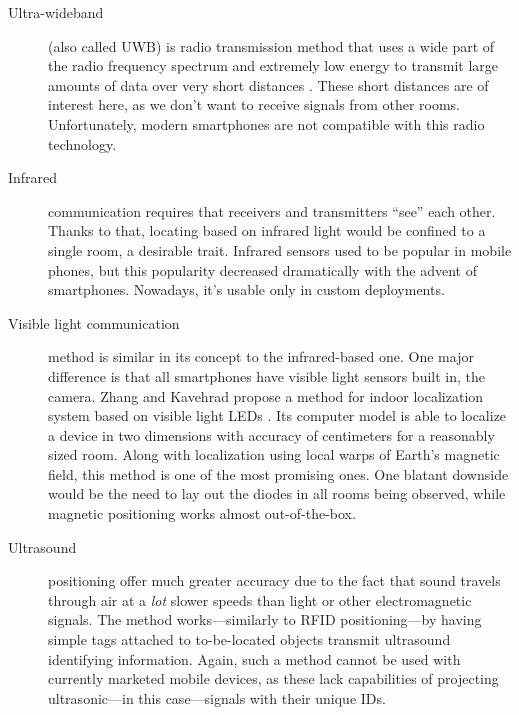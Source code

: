 \begin{description}
	\item[Ultra-wideband] (also called UWB) is radio transmission method that uses a wide part of the radio frequency spectrum and extremely low energy to transmit large amounts of data over very short distances \cite{ultra-wideband}. These short distances are of interest here, as we don't want to receive signals from other rooms. Unfortunately, modern smartphones are not compatible with this radio technology.
	
	\item[Infrared] communication requires that receivers and transmitters ``see'' each other. Thanks to that, locating based on infrared light would be confined to a single room, a desirable trait. Infrared sensors used to be popular in mobile phones, but this popularity decreased dramatically with the advent of smartphones. Nowadays, it's usable only in custom deployments.
	
	\item[Visible light communication] method is similar in its concept to the infrared-based one. One major difference is that all smartphones have visible light sensors built in, the camera. Zhang and Kavehrad propose a method for indoor localization system based on visible light LEDs \cite{Zhang:visible-light}. Its computer model is able to localize a device in two dimensions with accuracy of centimeters for a reasonably sized room. Along with localization using local warps of Earth's magnetic field, this method is one of the most promising ones. One blatant downside would be the need to lay out the diodes in all rooms being observed, while magnetic positioning works almost out-of-the-box.
	
	\item[Ultrasound] positioning offer much greater accuracy due to the fact that sound travels through air at a \emph{lot} slower speeds than light or other electromagnetic signals. The method works---similarly to RFID positioning---by having simple tags attached to to-be-located objects transmit ultrasound identifying information. Again, such a method cannot be used with currently marketed mobile devices, as these lack capabilities of projecting ultrasonic---in this case---signals with their unique IDs.
	

\end{description}
